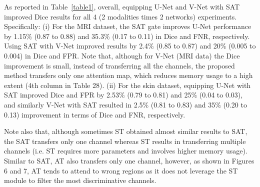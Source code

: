 \documentclass{article}
\begin{document}
As reported in Table~\ref{table1}, overall, equipping U-Net and V-Net with SAT improved Dice results for all  4 (2 modalities times 2 networks) experiments. Specifically: (i) For the MRI dataset, the SAT gate improves U-Net performance by 1.15\% (0.87 to 0.88) and 35.3\% (0.17 to 0.11) in Dice and FNR, respectively. Using SAT with V-Net improved results by 2.4\% (0.85 to 0.87) and 20\% (0.005 to 0.004) in Dice and FPR. Note that, although for V-Net (MRI data) the Dice improvement is small, instead of transferring all the channels, the proposed method transfers only one attention map, which reduces memory usage to a high extent (4th column in Table 28). (ii) For the skin dataset, equipping U-Net with SAT improved Dice and FPR by 2.53\% (0.79 to 0.81) and 25\% (0.04 to 0.03), and similarly V-Net with SAT resulted in 2.5\% (0.81 to 0.83) and 35\% (0.20 to 0.13) improvement in terms of Dice and FNR, respectively.

Note also that, although sometimes ST obtained almost similar results to SAT, the SAT transfers only one channel whereas ST results in transferring multiple channels (i.e. ST requires more parameters and involves higher memory usage). Similar to SAT, AT also transfers only one channel, however, as shown in Figures 6 and 7, AT tends to attend to wrong regions as it does not leverage the ST module to filter the most discriminative channels.
\end{document}

